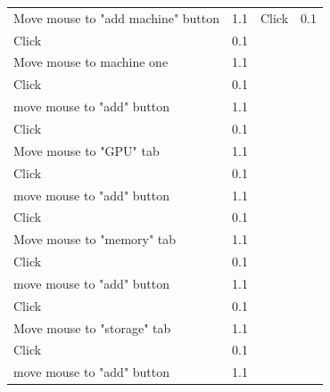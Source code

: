 \documentclass[11pt]{article}
\begin{document}
\begin{table}[]
{\begin{tabular}{llll}
					Move mouse to "add machine" button       & 1.1       & Click                                           & 0.1 \\
					Click                                    & 0.1       &                                                 &     \\
					Move mouse to machine one                & 1.1       &                                                 &     \\
					Click                                    & 0.1       &                                                 &     \\
					move mouse to "add" button               & 1.1       &                                                 &     \\
					Click                                    & 0.1       &                                                 &     \\
					Move mouse to "GPU" tab                  & 1.1       &                                                 &     \\
					Click                                    & 0.1       &                                                 &     \\
					move mouse to "add" button               & 1.1       &                                                 &     \\
					Click                                    & 0.1       &                                                 &     \\
					Move mouse to "memory" tab               & 1.1       &                                                 &     \\
					Click                                    & 0.1       &                                                 &     \\
					move mouse to "add" button               & 1.1       &                                                 &     \\
					Click                                    & 0.1       &                                                 &     \\
					Move mouse to "storage" tab              & 1.1       &                                                 &     \\
					Click                                    & 0.1       &                                                 &     \\
					move mouse to "add" button               & 1.1       &                                                 &     \\

\end{tabular}}
\end{table}
\end{document}
